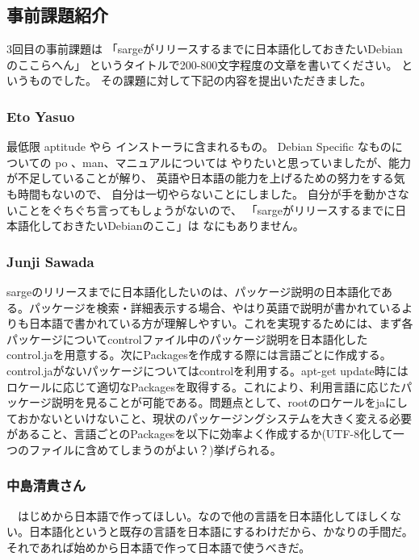 \documentclass[mingoth]{jsarticle}
\begin{document}
\subsection{事前課題紹介}

3回目の事前課題は
「sargeがリリースするまでに日本語化しておきたいDebianのここらへん」
というタイトルで200-800文字程度の文章を書いてください。
というものでした。
その課題に対して下記の内容を提出いただきました。

\subsubsection{Eto Yasuo}

最低限 aptitude やら インストーラに含まれるもの。
Debian Specific なものについての po 、man、マニュアルについては
やりたいと思っていましたが、能力が不足していることが解り、
英語や日本語の能力を上げるための努力をする気も時間もないので、
自分は一切やらないことにしました。
 自分が手を動かさないことをぐちぐち言ってもしょうがないので、
「sargeがリリースするまでに日本語化しておきたいDebianのここ」は
なにもありません。

\subsubsection{Junji Sawada}

sargeのリリースまでに日本語化したいのは、パッケージ説明の日本語化である。パッケージを検索・詳細表示する場合、やはり英語で説明が書かれているよりも日本語で書かれている方が理解しやすい。これを実現するためには、まず各パッケージについてcontrolファイル中のパッケージ説明を日本語化したcontrol.jaを用意する。次にPackagesを作成する際には言語ごとに作成する。control.jaがないパッケージについてはcontrolを利用する。apt-get update時にはロケールに応じて適切なPackagesを取得する。これにより、利用言語に応じたパッケージ説明を見ることが可能である。問題点として、rootのロケールをjaにしておかないといけないこと、現状のパッケージングシステムを大きく変える必要があること、言語ごとのPackagesを以下に効率よく作成するか(UTF-8化して一つのファイルに含めてしまうのがよい？)挙げられる。

\subsubsection{中島清貴さん}

　はじめから日本語で作ってほしい。なので他の言語を日本語化してほしくない。日本語化というと既存の言語を日本語にするわけだから、かなりの手間だ。それであれば始めから日本語で作って日本語で使うべきだ。
\end{document}
